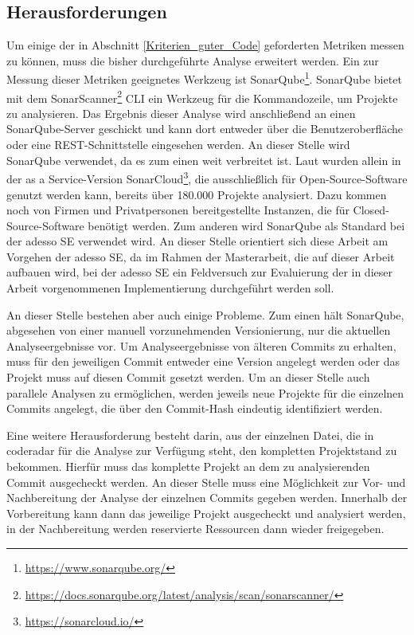 \documentclass[
	oneside,  %
	ngerman, 
	final, 
	11pt, 
	a4paper, 
	1.1headlines, 
	headinclude=false, 
	footinclude=false, 
	mpinclude=false, 
	pagesize, 
	onecolumn, 
	titlepage, 
	parskip=half, 
	headsepline, 
	chapterprefix=false, 
	version=first, 
	listof=totoc, 
	bibliography=totoc, 
	toc=graduated, 
	fleqn
]{scrbook}
\begin{document}
\subsection{Herausforderungen}
\label{Herausforderungen}
Um einige der in Abschnitt \ref{Kriterien_guter_Code} geforderten Metriken messen zu können, muss die bisher durchgeführte Analyse erweitert werden.
Ein zur Messung dieser Metriken geeignetes Werkzeug ist SonarQube\footnote{\url{https://www.sonarqube.org/}}.
SonarQube bietet mit dem SonarScanner\footnote{\url{https://docs.sonarqube.org/latest/analysis/scan/sonarscanner/}} \acf{CLI} ein Werkzeug für die Kommandozeile, um Projekte zu analysieren.
Das Ergebnis dieser Analyse wird anschließend an einen SonarQube-Server geschickt und kann dort entweder über die Benutzeroberfläche oder eine \acs{REST}-Schnittstelle eingesehen werden. 
An dieser Stelle wird SonarQube verwendet, da es zum einen weit verbreitet ist.
Laut \cite{SC2021} wurden allein in der \glqq as a Service\grqq{}-Version SonarCloud\footnote{\url{https://sonarcloud.io/}}, die ausschließlich für Open-Source-Software genutzt werden kann, bereits über 180.000 Projekte analysiert.
Dazu kommen noch von Firmen und Privatpersonen bereitgestellte Instanzen, die für Closed-Source-Software benötigt werden.
Zum anderen wird SonarQube als Standard bei der adesso SE verwendet wird.
An dieser Stelle orientiert sich diese Arbeit am Vorgehen der adesso SE, da im Rahmen der Masterarbeit, die auf dieser Arbeit aufbauen wird, bei der adesso SE ein Feldversuch zur Evaluierung der in dieser Arbeit vorgenommenen Implementierung durchgeführt werden soll.

An dieser Stelle bestehen aber auch einige Probleme.
Zum einen hält SonarQube, abgesehen von einer manuell vorzunehmenden Versionierung, nur die aktuellen Analyseergebnisse vor.
Um Analyseergebnisse von älteren Commits zu erhalten, muss für den jeweiligen Commit entweder eine Version angelegt werden oder das Projekt muss auf diesen Commit gesetzt werden.
Um an dieser Stelle auch parallele Analysen zu ermöglichen, werden jeweils neue Projekte für die einzelnen Commits angelegt, die über den Commit-Hash eindeutig identifiziert werden.

Eine weitere Herausforderung besteht darin, aus der einzelnen Datei, die in coderadar für die Analyse zur Verfügung steht, den kompletten Projektstand zu bekommen.
Hierfür muss das komplette Projekt an dem zu analysierenden Commit ausgecheckt werden.
An dieser Stelle muss eine Möglichkeit zur Vor- und Nachbereitung der Analyse der einzelnen Commits gegeben werden.
Innerhalb der Vorbereitung kann dann das jeweilige Projekt ausgecheckt und analysiert werden, in der Nachbereitung werden reservierte Ressourcen dann wieder freigegeben.
\end{document}
